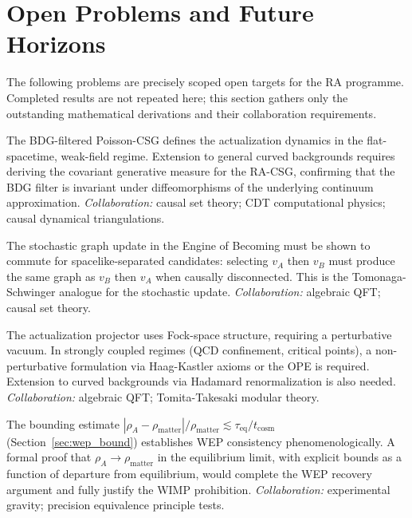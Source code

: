 \documentclass[11pt,a4paper]{article}
\theoremstyle{plain}
\theoremstyle{definition}
\theoremstyle{remark}
\begin{document}


\section{Open Problems and Future Horizons}
\label{sec:openproblems}

The following problems are precisely scoped open targets for the RA programme.
Completed results are not repeated here; this section gathers only the
outstanding mathematical derivations and their collaboration requirements.

\begin{description}[leftmargin=2em,labelwidth=!,labelsep=0.5em]

\item[\textbf{O1: Covariant generalisation of the generative measure.}]
The BDG-filtered Poisson-CSG defines the actualization dynamics in the
flat-spacetime, weak-field regime. Extension to general curved backgrounds
requires deriving the covariant generative measure for the RA-CSG, confirming
that the BDG filter is invariant under diffeomorphisms of the underlying
continuum approximation.
\textit{Collaboration:} causal set theory; CDT computational physics;
causal dynamical triangulations.

\item[\textbf{O2: Covariant Step~4 (stochastic update commutativity).}]
The stochastic graph update in the Engine of Becoming must be shown to
commute for spacelike-separated candidates: selecting $v_A$ then $v_B$
must produce the same graph as $v_B$ then $v_A$ when causally disconnected.
This is the Tomonaga-Schwinger analogue for the stochastic update.
\textit{Collaboration:} algebraic QFT; causal set theory.

\item[\textbf{O3: Non-perturbative regime of $\mathcal{P}_{\mathrm{act}}$.}]
The actualization projector uses Fock-space structure, requiring a perturbative
vacuum. In strongly coupled regimes (QCD confinement, critical points), a
non-perturbative formulation via Haag-Kastler axioms or the OPE is required.
Extension to curved backgrounds via Hadamard renormalization is also needed.
\textit{Collaboration:} algebraic QFT; Tomita-Takesaki modular theory.

\item[\textbf{O4: Formal WEP recovery.}]
The bounding estimate $|\rho_A - \rho_{\mathrm{matter}}|/\rho_{\mathrm{matter}}
\lesssim \tau_{\mathrm{eq}}/t_{\mathrm{cosm}}$ (Section~\ref{sec:wep_bound})
establishes WEP consistency phenomenologically.
A formal proof that $\rho_A \to \rho_{\mathrm{matter}}$ in the equilibrium limit,
with explicit bounds as a function of departure from equilibrium, would
complete the WEP recovery argument and fully justify the WIMP prohibition.
\textit{Collaboration:} experimental gravity; precision equivalence principle tests.


\end{description}
\end{document}

